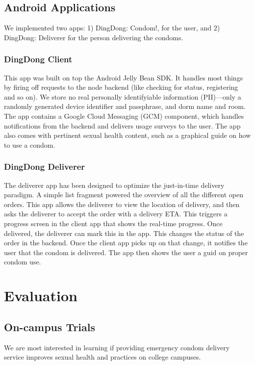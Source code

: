 \documentclass{acm_proc_article-sp}
\begin{document}
\subsection{Android Applications}
\smallskip
We implemented two apps: 1) DingDong: Condom!, for the user, and 2) DingDong: Deliverer for the person delivering the condoms.

\subsubsection{DingDong Client}
\smallskip
This app was built on top the Android Jelly Bean SDK. It handles most things by firing off requests to the node backend (like checking for status, registering and so on). We store no real personally identifyiable information (PII)---only a randomly generated device identifier and passphrase, and dorm name and room. The app contains a Google Cloud Messaging (GCM) component, which handles notifications from the backend and delivers usage surveys to the user. The app also comes with pertinent sexual health content, such as a graphical guide on how to use a condom.

\subsubsection{DingDong Deliverer}
\smallskip
The deliverer app has been designed to optimize the just-in-time delivery paradigm. A simple list fragment powered the overview of all the different open orders. This app allows the deliverer to view the location of delivery, and then asks the deliverer to accept the order with a delivery ETA. This triggers a progress screen in the client app that shows the real-time progress. Once delivered, the deliverer can mark this in the app. This changes the status of the order in the backend. Once the client app picks up on that change, it notifies the user that the condom is delivered. The app then shows the user a guid on proper condom use. 


\section{Evaluation}
\smallskip
\subsection{On-campus Trials}
\smallskip
We are most interested in learning if providing emergency condom delivery service improves sexual health and practices on college campuses. 
\end{document}
